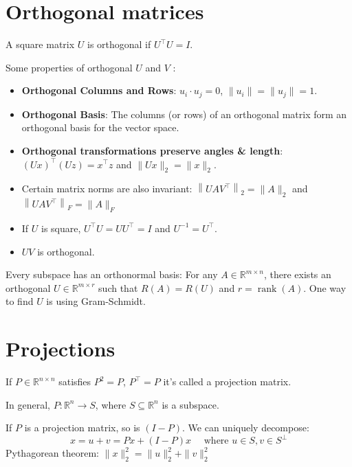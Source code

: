 \documentclass[13pt]{article}
\theoremstyle{definition}
\theoremstyle{remark}
\begin{document}
\begin{multicols}{2}

\section{Orthogonal matrices}
A square matrix $U$ is orthogonal if $U^{\top} U=I$. 

Some properties of orthogonal $U$ and $V$ :
\begin{itemize}
  \item \textbf{Orthogonal Columns and Rows}: $u_i\cdot u_j = 0$, $\|u_i\|=\|u_j\|=1$.
  
    \item \textbf{Orthogonal Basis}: The columns (or rows) of an orthogonal matrix form an orthogonal basis for the vector space.
  \item \textbf{Orthogonal transformations preserve angles \& length}: $(U x)^{\top}(U z)=x^{\top} z$ and $\|U x\|_{2}=\|x\|_{2}$.

  \item Certain matrix norms are also invariant: $\left\|U A V^{\top}\right\|_{2}=\|A\|_{2}$ and $\left\|U A V^{\top}\right\|_{F}=\|A\|_{F}$

  \item If $U$ is square, $U^{\top} U=U U^{\top}=I$ and $U^{-1}=U^{\top}$.

  \item $U V$ is orthogonal.

\end{itemize}

Every subspace has an orthonormal basis: For any $A \in \mathbb{R}^{m \times n}$, there exists an orthogonal $U \in \mathbb{R}^{m \times r}$ such that $R(A)=R(U)$ and $r=\operatorname{rank}(A)$. One way to find $U$ is using Gram-Schmidt.


\columnbreak


\section{Projections}
If $P \in \mathbb{R}^{n \times n}$ satisfies $P^{2}=P$, $P^\top = P$ it's called a projection matrix. 

In general, $P: \mathbb{R}^{n} \rightarrow S$, where $S \subseteq \mathbb{R}^{n}$ is a subspace. 

If $P$ is a projection matrix, so is $(I-P)$. We can uniquely decompose:
\[
x=u+v = P x + (I-P) x \quad  \text { where } u \in S, v \in S^{\perp}
\]
Pythagorean theorem: $\|x\|_{2}^{2}=\|u\|_{2}^{2}+\|v\|_{2}^{2}$


\end{multicols}
\end{document}
